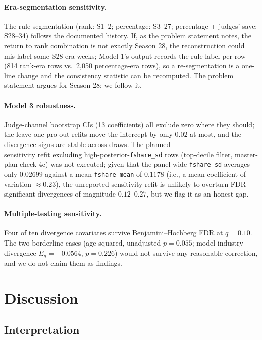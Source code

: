 \paragraph{Era-segmentation sensitivity.} The rule segmentation (rank: S1--2;
percentage: S3--27; percentage + judges' save: S28--34) follows the documented
history. If, as the problem statement notes, the return to rank combination is not
exactly Season 28, the reconstruction could mis-label some S28-era weeks;
Model 1's output records the rule label per row (814 rank-era rows vs.\ 2{,}050
percentage-era rows), so a re-segmentation is a one-line change and the
consistency statistic can be recomputed. The problem statement argues for
Season 28; we follow it.

\paragraph{Model 3 robustness.} Judge-channel bootstrap CIs (13 coefficients) all
exclude zero where they should; the leave-one-pro-out refits move the intercept by
only $0.02$ at most, and the divergence signs are stable across draws. The
planned \\ sensitivity refit excluding high-posterior-\texttt{fshare\_sd} rows
(top-decile filter, master-plan check 4c) was not executed; given that the
panel-wide \texttt{fshare\_sd} averages only $0.02699$ against a mean
\texttt{fshare\_mean} of $0.1178$ (i.e., a mean coefficient of variation
$\approx 0.23$), the unreported sensitivity refit is unlikely to overturn
FDR-significant divergences of magnitude $0.12$--$0.27$, but we flag it as an
honest gap.

\paragraph{Multiple-testing sensitivity.} Four of ten divergence covariates
survive Benjamini--Hochberg FDR at $q = 0.10$. The two borderline cases
(age-squared, unadjusted $p = 0.055$; model-industry divergence
$E_g = -0.0564$, $p = 0.226$) would not survive any reasonable correction, and we
do not claim them as findings.

\section{Discussion}

\subsection{Interpretation}

